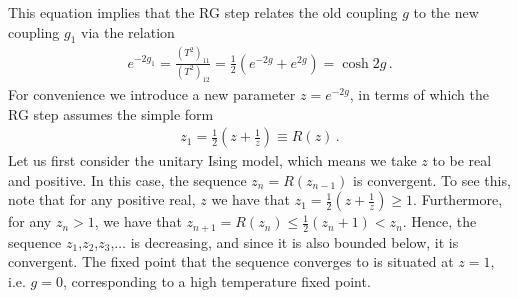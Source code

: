 This equation implies that the RG step relates the old coupling $g$ to the new coupling $g_1$ via the relation
\begin{gather}
  e^{-2g_1} =\frac{(T^2)_{11}}{(T^2)_{12}}=\frac12\left(e^{-2g}+e^{2g} \right) = \cosh 2g\,.
\end{gather}
For convenience we introduce a new parameter $z=e^{-2g}$, in terms of which the RG step assumes the simple form
\begin{gather}
 z_1 = \frac12\left(z + \frac{1}{z}\right)  \equiv R(z)\,.
\end{gather}
Let us first consider the unitary Ising model, which means we take $z$ to be real and positive. In this case, the sequence
$z_n = R(z_{n-1})$
is convergent. To see this, note that for any positive real, $z$ we have that $z_1 = \frac12\left(z+\frac{1}{z}\right) \geq 1$.
Furthermore, for any $z_n>1$, we have that $z_{n+1} = R(z_n) \leq \frac{1}{2}\left(z_n+1\right) < z_n$. Hence, the sequence $z_1$,$z_2$,$z_3$,$\ldots$ is decreasing, and since it is also bounded below, it is convergent. 
The fixed point that the sequence converges to is situated at $z=1$, i.e. $g=0$, corresponding to a high temperature fixed point.

